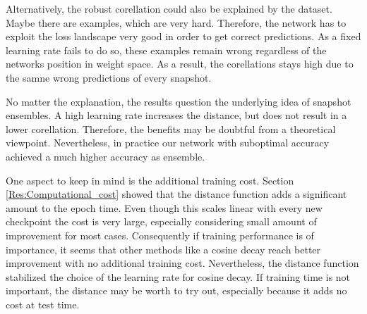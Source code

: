 Alternatively, the robust corellation could also be explained by the dataset. Maybe
there are examples, which are very hard. Therefore, the network has to exploit
the loss landscape very good in order to get correct predictions. As a fixed
learning rate fails to do so, these examples remain wrong regardless of the
networks position in weight space. As a result, the corellations stays high due
to the samne wrong predictions of every snapshot.

No matter the explanation, the results question the underlying idea of snapshot
ensembles. A high learning rate increases the distance, but does not result in a
lower corellation. Therefore, the benefits may be doubtful from a theoretical
viewpoint. Nevertheless, in practice our network with suboptimal accuracy
achieved a much higher accuracy as ensemble. 
\newline

One aspect to keep in mind is the additional training cost. Section
\ref{Res:Computational_cost} showed that the distance function adds a
significant amount to the epoch time. Even though this scales linear with every
new checkpoint the cost is very large, especially considering small amount of
improvement for most cases. Consequently if training performance is of
importance, it seems that other methods like a cosine decay reach better
improvement with no additional training cost. Nevertheless, the distance
function stabilized the choice of the learning rate for cosine decay. If
training time is not important, the distance may be worth to try out, especially
because it adds no cost at test time.


